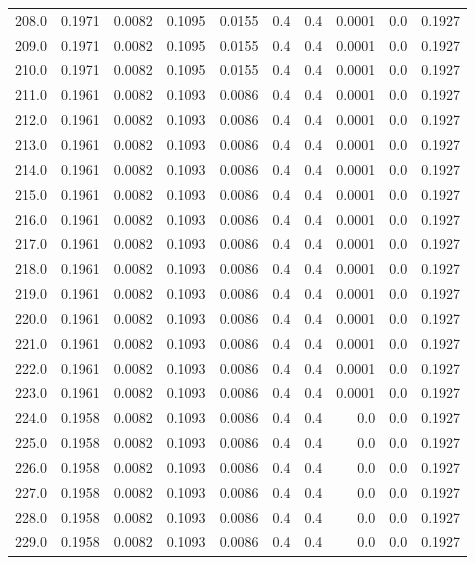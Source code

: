 \begin{longtable}{lrrrrrrrrr}
208.0 & 0.1971 & 0.0082 & 0.1095 & 0.0155 & 0.4 & 0.4 & 0.0001 & 0.0 & 0.1927 \\
209.0 & 0.1971 & 0.0082 & 0.1095 & 0.0155 & 0.4 & 0.4 & 0.0001 & 0.0 & 0.1927 \\
210.0 & 0.1971 & 0.0082 & 0.1095 & 0.0155 & 0.4 & 0.4 & 0.0001 & 0.0 & 0.1927 \\
211.0 & 0.1961 & 0.0082 & 0.1093 & 0.0086 & 0.4 & 0.4 & 0.0001 & 0.0 & 0.1927 \\
212.0 & 0.1961 & 0.0082 & 0.1093 & 0.0086 & 0.4 & 0.4 & 0.0001 & 0.0 & 0.1927 \\
213.0 & 0.1961 & 0.0082 & 0.1093 & 0.0086 & 0.4 & 0.4 & 0.0001 & 0.0 & 0.1927 \\
214.0 & 0.1961 & 0.0082 & 0.1093 & 0.0086 & 0.4 & 0.4 & 0.0001 & 0.0 & 0.1927 \\
215.0 & 0.1961 & 0.0082 & 0.1093 & 0.0086 & 0.4 & 0.4 & 0.0001 & 0.0 & 0.1927 \\
216.0 & 0.1961 & 0.0082 & 0.1093 & 0.0086 & 0.4 & 0.4 & 0.0001 & 0.0 & 0.1927 \\
217.0 & 0.1961 & 0.0082 & 0.1093 & 0.0086 & 0.4 & 0.4 & 0.0001 & 0.0 & 0.1927 \\
218.0 & 0.1961 & 0.0082 & 0.1093 & 0.0086 & 0.4 & 0.4 & 0.0001 & 0.0 & 0.1927 \\
219.0 & 0.1961 & 0.0082 & 0.1093 & 0.0086 & 0.4 & 0.4 & 0.0001 & 0.0 & 0.1927 \\
220.0 & 0.1961 & 0.0082 & 0.1093 & 0.0086 & 0.4 & 0.4 & 0.0001 & 0.0 & 0.1927 \\
221.0 & 0.1961 & 0.0082 & 0.1093 & 0.0086 & 0.4 & 0.4 & 0.0001 & 0.0 & 0.1927 \\
222.0 & 0.1961 & 0.0082 & 0.1093 & 0.0086 & 0.4 & 0.4 & 0.0001 & 0.0 & 0.1927 \\
223.0 & 0.1961 & 0.0082 & 0.1093 & 0.0086 & 0.4 & 0.4 & 0.0001 & 0.0 & 0.1927 \\
224.0 & 0.1958 & 0.0082 & 0.1093 & 0.0086 & 0.4 & 0.4 & 0.0 & 0.0 & 0.1927 \\
225.0 & 0.1958 & 0.0082 & 0.1093 & 0.0086 & 0.4 & 0.4 & 0.0 & 0.0 & 0.1927 \\
226.0 & 0.1958 & 0.0082 & 0.1093 & 0.0086 & 0.4 & 0.4 & 0.0 & 0.0 & 0.1927 \\
227.0 & 0.1958 & 0.0082 & 0.1093 & 0.0086 & 0.4 & 0.4 & 0.0 & 0.0 & 0.1927 \\
228.0 & 0.1958 & 0.0082 & 0.1093 & 0.0086 & 0.4 & 0.4 & 0.0 & 0.0 & 0.1927 \\
229.0 & 0.1958 & 0.0082 & 0.1093 & 0.0086 & 0.4 & 0.4 & 0.0 & 0.0 & 0.1927 \\

\end{longtable}
